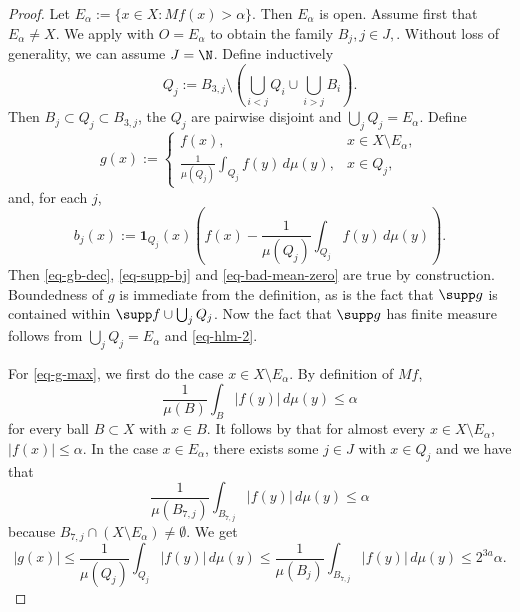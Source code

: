 \begin{proof}
\leanok
Let $E_\alpha:=\{x\in X: Mf(x)>\alpha\}$.
Then $E_\alpha$ is open. Assume first that $E_\alpha \ne X$. We apply  with $O=E_\alpha$ to obtain the family $B_j, j\in J,$. Without loss of generality, we can assume $J=\N$. Define inductively
\begin{equation}
    Q_j := B_{3,j} \setminus \left(\bigcup_{i<j} Q_i \cup \bigcup_{i>j} B_i \right).
\end{equation}
Then $B_j\subset Q_j\subset B_{3,j}$, the $Q_j$ are pairwise disjoint and $\bigcup_j Q_j = E_\alpha$.
Define
\begin{equation}
    \label{eq-g-def}
    g(x):=\begin{cases}
     f(x), & x\in X\setminus E_\alpha,\\
     \frac{1}{\mu(Q_j)}\int_{Q_j} f(y)\, d\mu(y), &x\in Q_j,
    \end{cases}
\end{equation}
and, for each $j$,
\begin{equation}
    b_j(x):= \mathbf{1}_{Q_j}(x) \left(f(x)-\frac{1}{\mu(Q_j)}\int_{Q_j} f(y)\, d\mu(y) \right).
\end{equation}
Then \eqref{eq-gb-dec}, \eqref{eq-supp-bj} and \eqref{eq-bad-mean-zero} are true by construction.
Boundedness of $g$ is immediate from the definition, as is the fact that $\supp g$ is contained within
$\supp f \cup \bigcup_j Q_j$. Now the fact that $\supp g$ has finite measure follows from
$\bigcup_j Q_j = E_\alpha$ and \eqref{eq-hlm-2}.

For \eqref{eq-g-max}, we first do the case $x\in X\setminus E_\alpha$. By definition of $Mf$,
\begin{equation}
    \frac{1}{\mu(B)}\int_B |f(y)|\,d\mu(y) \le \alpha
\end{equation}
for every ball $B\subset X$ with $x\in B$. It follows by  that for almost every $x\in X\setminus E_\alpha$, $|f(x)|\le \alpha$.
In the case $x\in E_\alpha$, there exists some $j\in J$ with $x\in Q_j$ and we have that
\begin{equation}
    \label{large-ball-estimate}
    \frac{1}{\mu(B_{7,j})} \int_{B_{7,j}} |f(y)| \,d\mu(y) \le \alpha
\end{equation}
because $B_{7,j}\cap (X\setminus E_\alpha) \ne \emptyset$. We get
\begin{equation}
    |g(x)| \le \frac{1}{\mu(Q_j)}\int_{Q_j} |f(y)|\, d\mu(y) \le \frac{1}{\mu(B_j)}\int_{B_{7,j}} |f(y)| \, d\mu(y) \le 2^{3a}\alpha .
\end{equation}


\end{proof}
